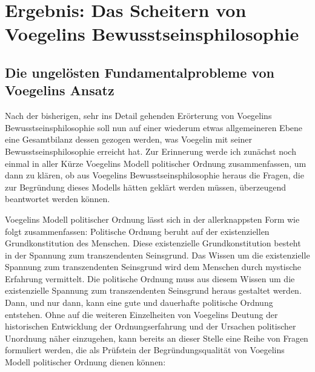
\chapter{Ergebnis: Das Scheitern von Voegelins Bewusstseinsphilosophie}

\section{Die ungelösten Fundamentalprobleme von Voegelins Ansatz}
\label{Scheitern}
\label{Fundamentalprobleme}

Nach der bisherigen, sehr ins Detail gehenden Erörterung von Voegelins
Bewusstseinsphilosophie soll nun auf einer wiederum etwas allgemeineren Ebene
eine Gesamtbilanz dessen gezogen werden, was Voegelin mit seiner
Bewusstseinsphilosophie erreicht hat. Zur Erinnerung werde ich zunächst noch
einmal in aller Kürze Voegelins Modell politischer Ordnung zusammenfassen,
um dann zu klären, ob aus Voegelins Bewusstseinsphilosophie heraus die Fragen,
die zur Begründung dieses Modells hätten geklärt werden müssen, überzeugend
beantwortet werden können.

Voegelins Modell politischer Ordnung lässt sich in der allerknappsten Form wie
folgt zusammenfassen: Politische Ordnung beruht auf der existenziellen
Grundkonstitution des Menschen. Diese existenzielle Grundkonstitution besteht
in der Spannung zum transzendenten Seinsgrund. Das Wissen um die existenzielle
Spannung zum transzendenten Seinsgrund wird dem Menschen durch mystische
Erfahrung vermittelt. Die politische Ordnung muss aus diesem Wissen um die
existenzielle Spannung zum transzendenten Seinsgrund heraus gestaltet werden.
Dann, und nur dann, kann eine gute und dauerhafte politische Ordnung
entstehen. Ohne auf die weiteren Einzelheiten von Voegelins Deutung der
historischen Entwicklung der Ordnungserfahrung und der Ursachen politischer
Unordnung näher einzugehen, kann bereits an dieser Stelle eine Reihe von
Fragen formuliert werden, die als Prüfstein der Begründungsqualität von
Voegelins Modell politischer Ordnung dienen können:

